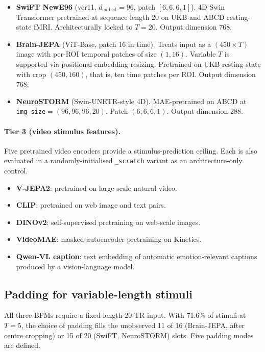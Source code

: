\documentclass[11pt, a4paper]{article}
\begin{document}
\begin{itemize}[leftmargin=1.4em, itemsep=2pt]
  \item \textbf{SwiFT NewE96} (ver11, $d_{\text{embed}}=96$, patch $[6,6,6,1]$).
        4D Swin Transformer pretrained at sequence length 20 on UKB and ABCD resting-state
        fMRI. Architecturally locked to $T=20$. Output dimension 768.
  \item \textbf{Brain-JEPA} (ViT-Base, patch 16 in time). Treats input as a
        $(450 \times T)$ image with per-ROI temporal patches of size $(1, 16)$. Variable
        $T$ is supported via positional-embedding resizing. Pretrained on UKB resting-state
        with crop $(450, 160)$, that is, ten time patches per ROI. Output dimension 768.
  \item \textbf{NeuroSTORM} (Swin-UNETR-style 4D). MAE-pretrained on ABCD at
        \texttt{img\_size}$=(96, 96, 96, 20)$. Patch $(6, 6, 6, 1)$. Output dimension 288.
\end{itemize}

\paragraph{Tier 3 (video stimulus features).} Five pretrained video encoders provide a
stimulus-prediction ceiling. Each is also evaluated in a randomly-initialised
\texttt{\_scratch} variant as an architecture-only control.

\begin{itemize}[leftmargin=1.4em, itemsep=2pt]
  \item \textbf{V-JEPA2}: pretrained on large-scale natural video.
  \item \textbf{CLIP}: pretrained on web image and text pairs.
  \item \textbf{DINOv2}: self-supervised pretraining on web-scale images.
  \item \textbf{VideoMAE}: masked-autoencoder pretraining on Kinetics.
  \item \textbf{Qwen-VL caption}: text embedding of automatic emotion-relevant captions
        produced by a vision-language model.
\end{itemize}

\subsection{Padding for variable-length stimuli}
\label{sec:padding}

All three BFMs require a fixed-length 20-TR input. With 71.6\% of stimuli at $T=5$, the
choice of padding fills the unobserved 11 of 16 (Brain-JEPA, after centre cropping) or
15 of 20 (SwiFT, NeuroSTORM) slots. Five padding modes are defined.
\end{document}
